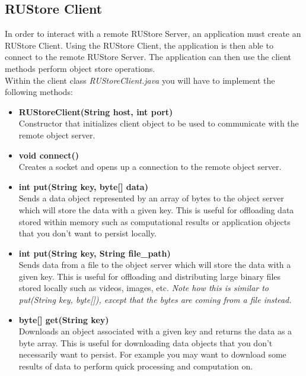 \documentclass{article}
\begin{document}
\subsection*{RUStore Client}
In order to interact with a remote RUStore Server, an application must create an RUStore Client. Using the RUStore Client, the application is then able to connect to the remote RUStore Server. The application can then use the client methods perform object store operations. \\

\noindent Within the client class \textit{RUStoreClient.java} you will have to implement the following methods: 
\begin{itemize}
    \item \textbf{RUStoreClient(String host, int port)} \vspace{0.1cm} \\ 
            Constructor that initializes client object to be used to communicate with the remote object server. 
    \item \textbf{void connect()} \vspace{0.1cm} \\
            Creates a socket and opens up a connection to the remote object server.
    \item \textbf{int put(String key, byte[] data)} \vspace{0.1cm} \\ 
            Sends a data object represented by an array of bytes to the object 
            server which will store the data with a given key. This is useful for offloading data stored within memory such as computational results or application objects that you don't want to persist locally. 
    \item \textbf{int put(String key, String file\_path)} \vspace{0.1cm} \\
            Sends data from a file to the object server which will store the data with a given key. This is useful for offloading and distributing large binary files stored locally such as videos, images, etc. \textit{Note how this is similar to put(String key, byte[]), except that the bytes are coming from a file instead.}
    \item \textbf{byte[] get(String key)} \vspace{0.1cm} \\
            Downloads an object associated with a given key and returns the data as a byte array. This is useful for downloading data objects that you don't necessarily want to persist. For example you may want to download some results of data to perform quick processing and computation on.

\end{itemize}
\end{document}

